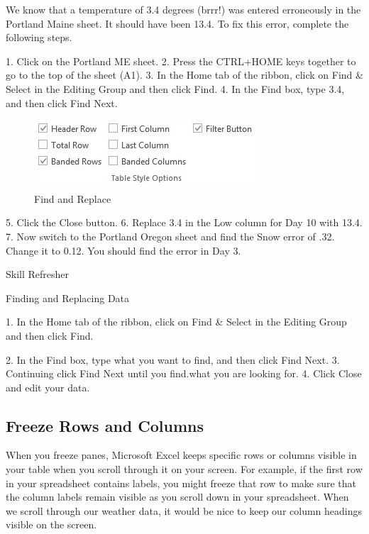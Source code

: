 We know that a temperature of 3.4 degrees (brrr!) was entered erroneously in the Portland Maine
sheet. It should have been 13.4. To fix this error, complete the following steps.

1.    Click on the Portland ME sheet.
2.    Press the CTRL+HOME keys together to go to the top of the sheet (A1).
3.    In the Home tab of the ribbon, click on Find \& Select in the Editing Group and then click Find.
4.    In the Find box, type 3.4, and then click Find Next.


\begin{figure}[H]
	\centering
	\includegraphics[width=\maxwidth{.95\linewidth}]{gfx/ch05_fig05}
	\caption{Find and Replace}
	\label{05:fig06}
\end{figure}





5. Click the Close button.
6. Replace 3.4 in the Low column for Day 10 with 13.4.
7. Now switch to the Portland Oregon sheet and find the Snow error of .32. Change it to 0.12. You
should find the error in Day 3.


Skill Refresher


Finding and Replacing Data

1. In the Home tab of the ribbon, click on Find \& Select in the Editing Group and then click Find.




2. In the Find box, type what you want to find, and then click Find Next.
3. Continuing click Find Next until you find.what you are looking for.
4. Click Close and edit your data.




\subsection{Freeze Rows and Columns}

When you freeze panes, Microsoft Excel keeps specific rows or columns visible in your table when
you scroll through it on your screen. For example, if the first row in your spreadsheet contains labels,
you might freeze that row to make sure that the column labels remain visible as you scroll down in
your spreadsheet. When we scroll through our weather data, it would be nice to keep our column
headings visible on the screen.

